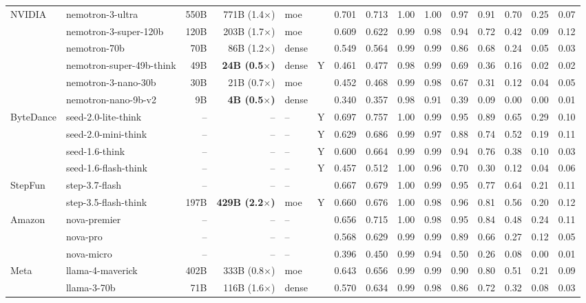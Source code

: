 \begin{longtable}{@{}ll r r l c rr rrrrrrr@{}}
NVIDIA & nemotron-3-ultra & 550B & 771B (1.4$\times$) & moe &  & 0.701 & 0.713 & 1.00 & 1.00 & 0.97 & 0.91 & 0.70 & 0.25 & 0.07 \\
 & nemotron-3-super-120b & 120B & 203B (1.7$\times$) & moe &  & 0.609 & 0.622 & 0.99 & 0.98 & 0.94 & 0.72 & 0.42 & 0.09 & 0.12 \\
 & nemotron-70b & 70B & 86B (1.2$\times$) & dense &  & 0.549 & 0.564 & 0.99 & 0.99 & 0.86 & 0.68 & 0.24 & 0.05 & 0.03 \\
 & nemotron-super-49b-think & 49B & \textbf{24B (0.5$\times$)} & dense & Y & 0.461 & 0.477 & 0.98 & 0.99 & 0.69 & 0.36 & 0.16 & 0.02 & 0.02 \\
 & nemotron-3-nano-30b & 30B & 21B (0.7$\times$) & moe &  & 0.452 & 0.468 & 0.99 & 0.98 & 0.67 & 0.31 & 0.12 & 0.04 & 0.05 \\
 & nemotron-nano-9b-v2 & 9B & \textbf{4B (0.5$\times$)} & dense &  & 0.340 & 0.357 & 0.98 & 0.91 & 0.39 & 0.09 & 0.00 & 0.00 & 0.01 \\
ByteDance & seed-2.0-lite-think & -- & -- & -- & Y & 0.697 & 0.757 & 1.00 & 0.99 & 0.95 & 0.89 & 0.65 & 0.29 & 0.10 \\
 & seed-2.0-mini-think & -- & -- & -- & Y & 0.629 & 0.686 & 0.99 & 0.97 & 0.88 & 0.74 & 0.52 & 0.19 & 0.11 \\
 & seed-1.6-think & -- & -- & -- & Y & 0.600 & 0.664 & 0.99 & 0.99 & 0.94 & 0.76 & 0.38 & 0.10 & 0.03 \\
 & seed-1.6-flash-think & -- & -- & -- & Y & 0.457 & 0.512 & 1.00 & 0.96 & 0.70 & 0.30 & 0.12 & 0.04 & 0.06 \\
StepFun & step-3.7-flash & -- & -- & -- &  & 0.667 & 0.679 & 1.00 & 0.99 & 0.95 & 0.77 & 0.64 & 0.21 & 0.11 \\
 & step-3.5-flash-think & 197B & \textbf{429B (2.2$\times$)} & moe & Y & 0.660 & 0.676 & 1.00 & 0.98 & 0.96 & 0.81 & 0.56 & 0.20 & 0.12 \\
Amazon & nova-premier & -- & -- & -- &  & 0.656 & 0.715 & 1.00 & 0.98 & 0.95 & 0.84 & 0.48 & 0.24 & 0.11 \\
 & nova-pro & -- & -- & -- &  & 0.568 & 0.629 & 0.99 & 0.99 & 0.89 & 0.66 & 0.27 & 0.12 & 0.05 \\
 & nova-micro & -- & -- & -- &  & 0.396 & 0.450 & 0.99 & 0.94 & 0.50 & 0.26 & 0.08 & 0.00 & 0.01 \\
Meta & llama-4-maverick & 402B & 333B (0.8$\times$) & moe &  & 0.643 & 0.656 & 0.99 & 0.99 & 0.90 & 0.80 & 0.51 & 0.21 & 0.09 \\
 & llama-3-70b & 71B & 116B (1.6$\times$) & dense &  & 0.570 & 0.634 & 0.99 & 0.98 & 0.86 & 0.72 & 0.32 & 0.08 & 0.03 \\

\end{longtable}

